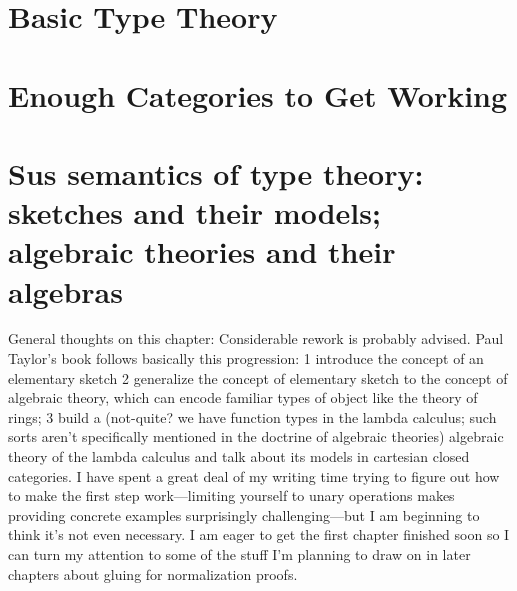 \documentclass[12pt,twoside]{reedthesis}
\theoremstyle{definition}
\theoremstyle{remark}
\theoremstyle{theorem}
\begin{document}
\chapter{Basic Type Theory}
\chapter{Enough Categories to Get Working}
\chapter{Sus semantics of type theory: sketches and their models; algebraic theories and their algebras}

% 


General thoughts on this chapter: Considerable rework is probably advised. Paul
Taylor's book follows basically this progression: 1\) introduce the concept of an
elementary sketch 2\) generalize the concept of elementary sketch to the concept
of algebraic theory, which can encode familiar types of object like the theory
of rings; 3\) build a (not-quite? we have function types in the lambda calculus;
such sorts aren't specifically mentioned in the doctrine of algebraic theories)
algebraic theory of the lambda calculus and talk about its models in cartesian
closed categories. I have spent a great deal of my writing time trying to figure
out how to make the first step work—limiting yourself to unary operations makes
providing concrete examples surprisingly challenging—but I am beginning to think
it's not even necessary. I am eager to get the first chapter finished soon so I
can turn my attention to some of the stuff I'm planning to draw on in later
chapters about gluing for normalization proofs.
\end{document}
